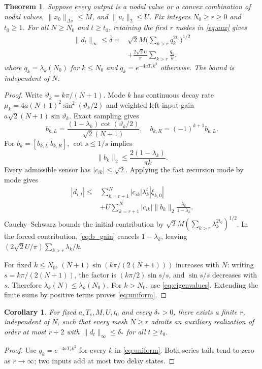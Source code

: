 \documentclass[letterpaper,10pt,conference]{ieeeconf}
\newtheorem{theorem}{Theorem}
\newtheorem{corollary}{Corollary}
\theoremstyle{remark}\newtheorem{remark}{Remark}
\begin{document}
\begin{theorem}\label{thm:uniform}
Suppose every output is a nodal value or a convex combination of nodal values, $\|x_0\|_{\Delta x}\le M$, and $\|u_t\|_2\le U$. Fix integers $N_0\ge r\ge0$ and $t_0\ge1$. For all $N\ge N_0$ and $t\ge t_0$, retaining the first $r$ modes in \eqref{eq:aux} gives
\begin{equation}\label{eq:uniform}
\begin{split}
\|d_t\|_\infty\le\bar\delta={}&
\sqrt2M\Big(\sum_{k>r}q_k^{2t_0}\Big)^{1/2}\\
&+\frac{2\sqrt2U}{\pi}\sum_{k>r}\frac{q_k}{k},
\end{split}
\end{equation}
where $q_k=\lambda_k(N_0)$ for $k\le N_0$ and $q_k=e^{-4aT_sk^2}$ otherwise. The bound is independent of $N$.
\end{theorem}
\begin{proof}
Write $\vartheta_k=k\pi/(N+1)$. Mode $k$ has continuous decay rate $\mu_k=4a(N+1)^2\sin^2(\vartheta_k/2)$ and weighted left-input gain $a\sqrt2(N+1)\sin\vartheta_k$. Exact sampling gives
\[
b_{k,L}=\frac{(1-\lambda_k)\cot(\vartheta_k/2)}{\sqrt2(N+1)},\quad
b_{k,R}=(-1)^{k+1}b_{k,L}.
\]
For $b_k=[b_{k,L}\ b_{k,R}]$, $\cot s\le1/s$ implies
\begin{equation}\label{eq:b_gain}
\|b_k\|_2\le\frac{2(1-\lambda_k)}{\pi k}.
\end{equation}
Every admissible sensor has $|c_{ik}|\le\sqrt2$. Applying the fast recursion mode by mode gives
\begin{align*}
|d_{i,t}|\le{}&\sum_{k=r+1}^N|c_{ik}|\lambda_k^t|\xi_{k,0}|\\
&+U\sum_{k=r+1}^N|c_{ik}|\|b_k\|_2
\frac{\lambda_k}{1-\lambda_k}.
\end{align*}
Cauchy--Schwarz bounds the initial contribution by $\sqrt2M(\sum_{k>r}\lambda_k^{2t_0})^{1/2}$. In the forced contribution, \eqref{eq:b_gain} cancels $1-\lambda_k$, leaving $(2\sqrt2U/\pi)\sum_{k>r}\lambda_k/k$.

For fixed $k\le N_0$, $(N+1)\sin(k\pi/(2(N+1)))$ increases with $N$: writing $s=k\pi/(2(N+1))$, the factor is $(k\pi/2)\sin s/s$, and $\sin s/s$ decreases with $s$. Therefore $\lambda_k(N)\le\lambda_k(N_0)$. For $k>N_0$, use \eqref{eq:eigenvalues}. Extending the finite sums by positive terms proves \eqref{eq:uniform}.
\end{proof}

\begin{corollary}\label{cor:order}
For fixed $a,T_s,M,U,t_0$ and every $\delta_*>0$, there exists a finite $r$, independent of $N$, such that every mesh $N\ge r$ admits an auxiliary realization of order at most $r+2$ with $\|d_t\|_\infty\le\delta_*$ for all $t\ge t_0$.
\end{corollary}
\begin{proof}
Use $q_k=e^{-4aT_sk^2}$ for every $k$ in \eqref{eq:uniform}. Both series tails tend to zero as $r\to\infty$; two inputs add at most two delay states.
\end{proof}
\end{document}
